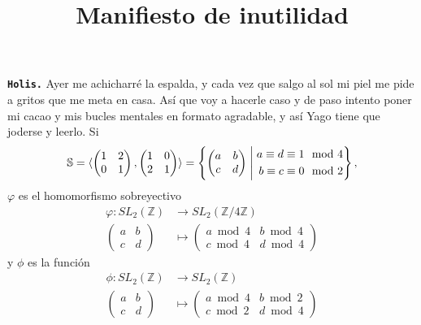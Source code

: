 \documentclass{article}
\title{Manifiesto de inutilidad}
\date{}
\newcommand\tab[1][0.6cm]{\hspace*{#1}}
\newcommand\nl{\newline\tab}
\newcommand{\suchthat}{\;\ifnum\currentgrouptype=16 \middle\fi|\;}
\begin{document}
	\maketitle
	\large{\textbf{\texttt{Holis.}}} \nl 
	Ayer me achicharré la espalda, y cada vez que salgo al sol mi piel me pide a gritos que me meta en casa. \nl Así que voy a hacerle caso y de paso intento poner mi cacao y mis bucles mentales en formato agradable, y así Yago tiene que joderse y leerlo.\nl \nl 
	Si $$\mathbb{S} = 
	\langle
	\begin{pmatrix}
	1 & 2 \\
	0 & 1 
	\end{pmatrix},
	\begin{pmatrix}
	1 & 0 \\
	2 & 1 
	\end{pmatrix}
	\rangle = \left\{ 
	\begin{pmatrix}
	a & b \\
	c & d 
	\end{pmatrix}
	\suchthat
	\begin{split}
	a \equiv d \equiv 1 &\mod 4 \\
	b \equiv c \equiv 0 &\mod 2 
	\end{split}
	\right\}, $$
	$\varphi$ es el homomorfismo sobreyectivo
	\begin{align*}	
	\varphi\colon SL_2(\mathbb{Z}) & \longrightarrow SL_2(\mathbb{Z}/ 4\mathbb{Z}) \\
			       \begin{pmatrix} 
					a & b\\
					c & d 
					\end{pmatrix} & \longmapsto
													\begin{pmatrix}
													a\bmod 4 & b \bmod 4 \\
													c\bmod 4 & d \bmod 4
													\end{pmatrix}
	\end{align*} y 
	$\phi$ es la función
	\begin{align*}	
	\phi\colon SL_2(\mathbb{Z}) & \longrightarrow SL_2(\mathbb{Z}) \\
	\begin{pmatrix} 
	a & b\\
	c & d 
	\end{pmatrix} & \longmapsto
	\begin{pmatrix}
	a\bmod 4 & b \bmod 2 \\
	c\bmod 2 & d \bmod 4
	\end{pmatrix}
	\end{align*}
\end{document}

